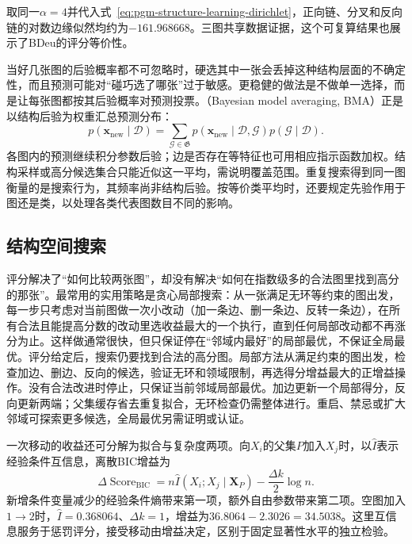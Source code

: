 取同一$\alpha=4$并代入式~\eqref{eq:pgm-structure-learning-dirichlet}，正向链、分叉和反向链的对数边缘似然均约为$-161.968668$。三图共享数据证据，这个可复算结果也展示了BDeu的评分等价性。

当好几张图的后验概率都不可忽略时，硬选其中一张会丢掉这种结构层面的不确定性，而且预测可能对“碰巧选了哪张”过于敏感。更稳健的做法是不做单一选择，而是让每张图都按其后验概率对预测投票。（Bayesian model averaging, BMA）正是以结构后验为权重汇总预测分布：
\[
  p(\bm{x}_{\mathrm{new}}\mid\mathcal{D})
  =\sum_{\mathcal{G}\in\mathfrak{G}}
    p(\bm{x}_{\mathrm{new}}\mid\mathcal{D},\mathcal{G})
    p(\mathcal{G}\mid\mathcal{D}).
\]
各图内的预测继续积分参数后验；边是否存在等特征也可用相应指示函数加权。结构采样或高分候选集合只能近似这一平均，需说明覆盖范围。重复搜索得到同一图衡量的是搜索行为，其频率尚非结构后验。按等价类平均时，还要规定先验作用于图还是类，以处理各类代表图数目不同的影响。

\subsection{结构空间搜索}
\label{sec:pgm-structure-learning-search}

评分解决了“如何比较两张图”，却没有解决“如何在指数级多的合法图里找到高分的那张”。最常用的实用策略是贪心局部搜索：从一张满足无环等约束的图出发，每一步只考虑对当前图做一次小改动（加一条边、删一条边、反转一条边），在所有合法且能提高分数的改动里选收益最大的一个执行，直到任何局部改动都不再涨分为止。这样做通常很快，但只保证停在“邻域内最好”的局部最优，不保证全局最优。评分给定后，搜索仍要找到合法的高分图。局部方法从满足约束的图出发，检查加边、删边、反向的候选，验证无环和领域限制，再选得分增益最大的正增益操作。没有合法改进时停止，只保证当前邻域局部最优。加边更新一个局部得分，反向更新两端；父集缓存省去重复拟合，无环检查仍需整体进行。重启、禁忌或扩大邻域可探索更多候选，全局最优另需证明或认证。

一次移动的收益还可分解为拟合与复杂度两项。向$X_i$的父集$P$加入$X_j$时，以$\widehat I$表示经验条件互信息，离散BIC增益为
\begin{equation}
  \Delta\operatorname{Score}_{\mathrm{BIC}}
  =n\widehat I(X_i;X_j\mid\bm{X}_P)
   -\frac{\Delta k}{2}\log n.
  \label{eq:pgm-structure-learning-score-gain}
\end{equation}
新增条件变量减少的经验条件熵带来第一项，额外自由参数带来第二项。空图加入$1\to2$时，$\widehat I=0.368064$、$\Delta k=1$，增益为$36.8064-2.3026=34.5038$。这里互信息服务于惩罚评分，接受移动由增益决定，区别于固定显著性水平的独立检验。


